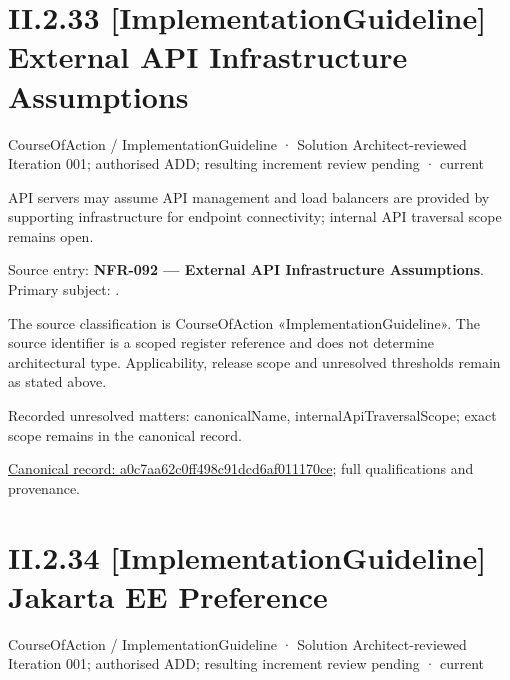 \section*{II.2.33 [ImplementationGuideline] External API Infrastructure Assumptions}
\label{navigation:II.2.33}

\label{element:a0c7aa62c0ff498c91dcd6af011170ce}
{\small CourseOfAction / ImplementationGuideline · Solution Architect-reviewed Iteration 001; authorised ADD; resulting increment review pending · current}\par

API servers may assume API management and load balancers are provided by supporting infrastructure for endpoint connectivity; internal API traversal scope remains open.



Source entry: \textbf{NFR-092 — External API Infrastructure Assumptions}. Primary subject: \texttt{}.



The source classification is CourseOfAction «ImplementationGuideline». The source identifier is a scoped register reference and does not determine architectural type. Applicability, release scope and unresolved thresholds remain as stated above.


{\small Recorded unresolved matters: canonicalName, internalApiTraversalScope; exact scope remains in the canonical record.}\par
{\footnotesize \href{../../../../continuum/strategy/course-of-action/implementation-guideline/a0c7aa62c0ff498c91dcd6af011170ce.md}{Canonical record: a0c7aa62c0ff498c91dcd6af011170ce}; full qualifications and provenance.}\par
\section*{II.2.34 [ImplementationGuideline] Jakarta EE Preference}
\label{navigation:II.2.34}

\label{element:17ae70b671b5451a812df11d59ff6e1c}
{\small CourseOfAction / ImplementationGuideline · Solution Architect-reviewed Iteration 001; authorised ADD; resulting increment review pending · current}\par

